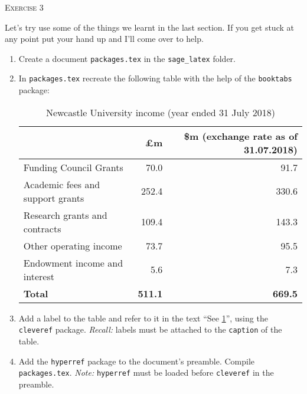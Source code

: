 \documentclass{article}
\begin{document}
\begin{center}
  \Large\color{black!80}\textsc{Exercise 3}
\end{center}

Let's try use some of the things we learnt in the last section. If you
get stuck at any point put your hand up and I'll come over to help.

\begin{enumerate}[label=\color{purple}\theenumi.]

  \item Create a document \texttt{packages.tex} in the \texttt{sage\_latex}
    folder.

  \item{In \texttt{packages.tex} recreate the following table with the help of
    the \texttt{booktabs} package:

    \begin{table}[h]
      \begin{tabular}{@{}lrr@{}}
        \toprule
        & \textbf{£m} & \textbf{\$m (exchange rate as of 31.07.2018)} \\\midrule
        Funding Council Grants           & 70.0  & 91.7  \\
        Academic fees and support grants & 252.4 & 330.6 \\
        Research grants and contracts    & 109.4 & 143.3 \\
        Other operating income           & 73.7  & 95.5  \\
        Endowment income and interest    & 5.6   & 7.3   \\\midrule
        \textbf{Total} & \textbf{511.1} & \textbf{669.5} \\\bottomrule
      \end{tabular}
      \caption{Newcastle University income (year ended 31 July 2018)}
      \label{tab:newcy}
    \end{table}
  }

  \item Add a label to the table and refer to it in the text
    ``See \cref{tab:newcy}'', using the \texttt{cleveref} package.
    \textsl{Recall:} labels must be attached to the \texttt{caption} of the
    table.

  \item Add the \texttt{hyperref} package to the document's preamble.
    Compile \texttt{packages.tex}. \textsl{Note:} \texttt{hyperref} must be 
    loaded before \texttt{cleveref} in the preamble. 


\end{enumerate}
\end{document}

